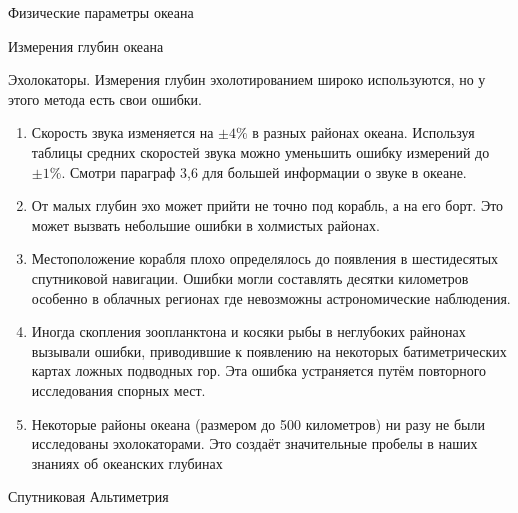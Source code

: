\begin{chapter}{Физические параметры океана}
\begin{section}{Измерения глубин океана}
\begin{subsection}{Эхолокаторы.}
Измерения глубин эхолотированием широко используются, но у этого
метода есть свои ошибки.
\begin{enumerate}
\item
Скорость звука изменяется на $\pm 4\mbox{\%}$ в разных районах
океана. Используя таблицы средних скоростей звука можно уменьшить
ошибку измерений до $\pm 1\mbox{\%}$. Смотри параграф 3,6 для большей
информации о звуке в океане.

\item
От малых глубин эхо может прийти не точно под корабль, а на его
борт. Это может вызвать небольшие ошибки в холмистых районах.

\item
Местоположение корабля плохо определялось до появления в шестидесятых
спутниковой навигации. Ошибки могли составлять десятки километров
особенно в облачных регионах где невозможны астрономические
наблюдения.
 
\item
Иногда скопления зоопланктона и косяки рыбы в неглубоких райнонах
вызывали ошибки, приводившие к появлению на некоторых батиметрических
картах ложных подводных гор. Эта ошибка устраняется путём повторного
исследования спорных мест.

\item
Некоторые районы океана (размером до 500 километров) ни разу не были
исследованы эхолокаторами. Это создаёт значительные пробелы в наших
знаниях об океанских глубинах
\end{enumerate}




\end{subsection}

\begin{subsection}{Спутниковая Альтиметрия}


\end{subsection}
\end{section}
\end{chapter}

